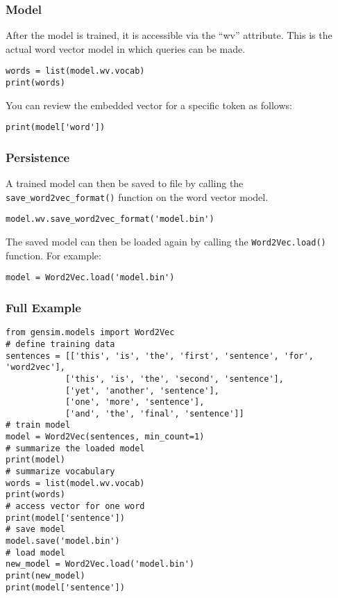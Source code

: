 \begin{frame}[fragile]\frametitle{Model }
After the model is trained, it is accessible via the “wv” attribute. This is the actual word vector model in which queries can be made.

\begin{lstlisting}
words = list(model.wv.vocab)
print(words)
\end{lstlisting}

You can review the embedded vector for a specific token as follows:
\begin{lstlisting}
print(model['word'])
\end{lstlisting}

\end{frame}

\begin{frame}[fragile]\frametitle{Persistence }
A trained model can then be saved to file by calling the \lstinline|save_word2vec_format()| function on the word vector model.

\begin{lstlisting}
model.wv.save_word2vec_format('model.bin')
\end{lstlisting}

The saved model can then be loaded again by calling the \lstinline|Word2Vec.load()| function. For example:
\begin{lstlisting}
model = Word2Vec.load('model.bin')
\end{lstlisting}

\end{frame}


\begin{frame}[fragile]\frametitle{Full Example }
\begin{lstlisting}
from gensim.models import Word2Vec
# define training data
sentences = [['this', 'is', 'the', 'first', 'sentence', 'for', 'word2vec'],
			['this', 'is', 'the', 'second', 'sentence'],
			['yet', 'another', 'sentence'],
			['one', 'more', 'sentence'],
			['and', 'the', 'final', 'sentence']]
# train model
model = Word2Vec(sentences, min_count=1)
# summarize the loaded model
print(model)
# summarize vocabulary
words = list(model.wv.vocab)
print(words)
# access vector for one word
print(model['sentence'])
# save model
model.save('model.bin')
# load model
new_model = Word2Vec.load('model.bin')
print(new_model)
print(model['sentence'])
\end{lstlisting}

\end{frame}

